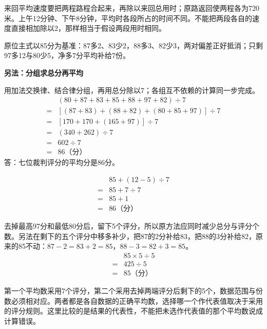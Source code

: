 \documentclass[multi=snippet,border=0pt]{standalone}
\newenvironment{snippet}[3]{\begin{minipage}{#1bp}\color{answerred}\fontsize{#2}{#3}\selectfont\raggedright}{\end{minipage}}
\begin{document}
\begin{snippet}{505}{11.5}{14}来回平均速度要把两程路程合起来，再除以来回总用时；原路返回使两程各为720米。上午12分钟、下午8分钟，平均时各段所占的时间不同。不能把两段各自的速度直接相加除以2，那样相当于假设两段用时相同。\end{snippet}
\begin{snippet}{505}{11.5}{14}原位主式以85分为基准：87多2、83少2，88多3、82少3，两对偏差正好抵消；只剩97多12与80少5，净多7分平均补给7份。\par\textbf{另法：分组求总分再平均}\par 用加法交换律、结合律分组，再用总分除以7；各组互不依赖的计算同一步完成。\[\begin{aligned}&(80+87+83+85+88+97+82)\div7\\={}&[(87+83)+(88+82)+(80+85+97)]\div7\\={}&[170+170+(165+97)]\div7\\={}&(340+262)\div7\\={}&602\div7\\={}&86\text{（分）}\end{aligned}\]答：七位裁判评分的平均分是86分。\end{snippet}
\begin{snippet}{189}{9.0}{12.8}\[\begin{aligned}&85+(12-5)\div7\\={}&85+7\div7\\={}&85+1\\={}&86\text{（分）}\end{aligned}\]\end{snippet}
\begin{snippet}{505}{11.5}{14}去掉最高97分和最低80分后，留下5个评分，所以原方法应同时减少总分与评分个数。另法在剩下的五个评分中移多补少，把87的2分补给83，把88的3分补给82，原来的85不动：\(87-2=83+2=85\)，\(88-3=82+3=85\)。\[\begin{aligned}&85\times5\div5\\={}&425\div5\\={}&85\text{（分）}\end{aligned}\]\end{snippet}
\begin{snippet}{505}{11.5}{14}第一个平均数采用7个评分，第二个采用去掉两端评分后剩下的5个，数据范围与份数必须相对应。两者都是各自数据的正确平均数，选择哪一个作代表值取决于采用的评分规则。这里比较的是结果的代表性，不能把未选作代表值的那个平均数说成计算错误。\end{snippet}
\end{document}
